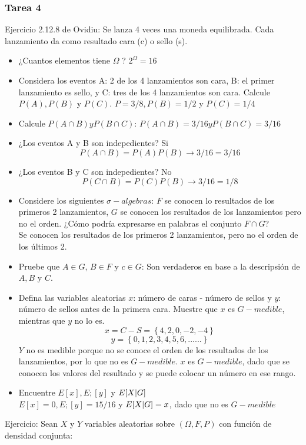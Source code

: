 \documentclass[11pt,fleqn]{book} %
\numberwithin{equation}{section} %
\numberwithin{figure}{section} %
\numberwithin{table}{section} %
\begin{document}
\subsubsection{Tarea 4}
Ejercicio 2.12.8 de Ovidiu: Se lanza 4 veces una moneda equilibrada. Cada lanzamiento da como resultado cara (c) o sello (s).
\begin{itemize}
    \item ¿Cuantos elementos tiene $\Omega$ ? $2^{\Omega} = 16 $
    \item Considera los eventos A: 2 de los 4 lanzamientos son cara, B: el primer lanzamiento es sello, y C: tres de los 4 lanzamientos son cara. Calcule $P(A), P(B)$ y $P(C)$. $P= 3/8, P(B) = 1/2$ y $P(C) = 1/4$
    \item Calcule $P(A \cap B) y P(B \cap C) $: $P(A \cap B)= 3/16 y P(B \cap C) = 3/16 $
    \item ¿Los eventos A y B son indepedientes? Si
    $$ P(A \cap B) = P(A)P(B) \rightarrow 3/16 = 3/16 $$
    \item ¿Los eventos B y C son indepedientes? No
    $$ P(C \cap B) = P(C)P(B) \rightarrow 3/16 = 1/8 $$
    \item Considere los siguientes $\sigma-algebras$: $F$ se conocen lo resultados de los primeros 2 lanzamientos, $G$ se conocen los resultados de los lanzamientos pero no el orden. ¿Cómo podría expresarse en palabras el conjunto $F \cap G$?\\
    Se conocen los resultados de los primeros 2 lanzamientos, pero no el orden de los últimos 2.
    \item Pruebe que $A \in G$, $B \in F$ y $c \in G$: Son verdaderos en base a la descripsión de $A,B$ y $C$.
    \item Defina las variables aleatorias $x$: número de caras - número de sellos y  $y$: número de sellos antes de la primera cara. Muestre que $x$ es $G-medible$, mientras que $y$ no lo es.
    $$ x = C - S = \left\{ 4,2,0,-2,-4 \right\}$$ 
    $$ y = \left\{ 0,1,2,3,4,5,6,...... \right\}$$
    $Y$ no es medible porque no se conoce el orden de los resultados de los lanzamientos, por lo que no es $G-medible$. $x$ es $G-medible$, dado que se conocen los valores del resultado y se puede colocar un número en ese rango.
    \item Encuentre $E[x], E;[y] $ y $E[X \arrowvert G]$\\
    $E[x] = 0, E;[y]= 15/16 $ y $E[X \arrowvert G] = x$, dado que no es $G-medible$
\end{itemize}
Ejercicio: Sean $X$ y $Y$ variables aleatorias sobre $(\Omega, F, P)$ con función de densidad conjunta: 
\end{document}
